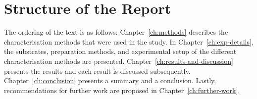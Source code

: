 %
\section{Structure of the Report}
The ordering of the text is as follows: Chapter~\ref{ch:methods} describes the characterisation methods that were used in the study. In Chapter~\ref{ch:exp-details}, the substrates, preparation methods, and experimental setup of the different characterisation methods are presented. Chapter~\ref{ch:results-and-discussion} presents the results and each result is discussed subsequently. Chapter~\ref{ch:conclusion} presents a summary and a conclusion. Lastly, recommendations for further work are proposed in Chapter~\ref{ch:further-work}.
%

